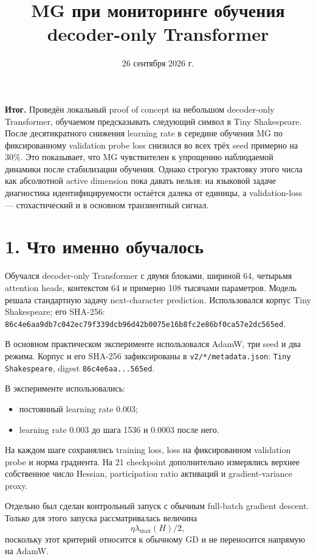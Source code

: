 \documentclass[10pt,a4paper]{article}
\title{MG при мониторинге обучения decoder-only Transformer}
\author{}
\date{26 сентября 2026 г.}
\begin{document}
\maketitle

\textbf{Итог.} Проведён локальный proof of concept на небольшом decoder-only Transformer,
обучаемом предсказывать следующий символ в Tiny Shakespeare. После десятикратного
снижения learning rate в середине обучения MG по фиксированному validation probe loss
снизился во всех трёх seed примерно на 30\%. Это показывает, что MG чувствителен к
упрощению наблюдаемой динамики после стабилизации обучения. Однако строгую трактовку
этого числа как абсолютной active dimension пока давать нельзя: на языковой задаче
диагностика идентифицируемости остаётся далека от единицы, а validation-loss ---
стохастический и в основном транзиентный сигнал.

\section*{1. Что именно обучалось}

Обучался decoder-only Transformer с двумя блоками, шириной 64, четырьмя attention heads,
контекстом 64 и примерно 108 тысячами параметров. Модель решала стандартную задачу
next-character prediction. Использовался корпус Tiny Shakespeare; его SHA-256:
\texttt{86c4e6aa9db7c042ec79f339dcb96d42b0075e16b8fc2e86bf0ca57e2dc565ed}.

В основном практическом эксперименте использовался AdamW, три seed и два режима.
Корпус и его SHA-256 зафиксированы в \texttt{v2/*/metadata.json}:
\texttt{Tiny Shakespeare}, digest \texttt{86c4e6aa...565ed}.

В эксперименте использовались:

\begin{itemize}
\item постоянный learning rate $0.003$;
\item learning rate $0.003$ до шага 1536 и $0.0003$ после него.
\end{itemize}

На каждом шаге сохранялись training loss, loss на фиксированном validation probe и
норма градиента. На 21 checkpoint дополнительно измерялись верхнее собственное число
Hessian, participation ratio активаций и gradient-variance proxy.

Отдельно был сделан контрольный запуск с обычным full-batch gradient descent. Только
для этого запуска рассматривалась величина
\[
  \eta\lambda_{\max}(H)/2,
\]
поскольку этот критерий относится к обычному GD и не переносится напрямую на AdamW.
\end{document}
